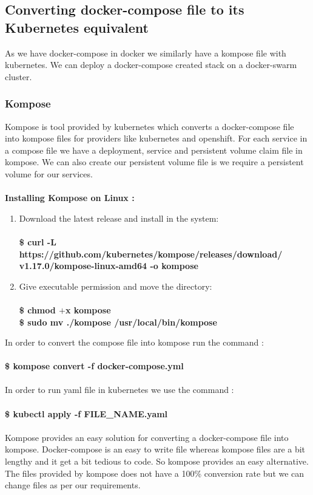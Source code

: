 \documentclass[12pt]{article}
\begin{document}
\subsection{Converting docker-compose file to its Kubernetes equivalent}
As we have docker-compose in docker we similarly have a kompose file with kubernetes. We can deploy a docker-compose created stack on a docker-swarm cluster. 
\subsubsection{Kompose}
Kompose is tool provided by kubernetes which converts a docker-compose file into kompose files for providers like kubernetes and openshift. For each service in a compose file we have a deployment, service and persistent volume claim file in kompose. We can also create our persistent volume file is we require a persistent volume for our services.\\\\
\textbf{Installing Kompose on Linux :}
\begin{enumerate}
	\item Download the latest release and install in the system:\\\\
	\textbf{\$ curl -L https://github.com/kubernetes/kompose/releases/download/\\v1.17.0/kompose-linux-amd64 -o kompose}
	\item Give executable permission and move the directory:\\\\
	\textbf{\$ chmod $+$x kompose\\
		\$ sudo mv ./kompose /usr/local/bin/kompose}
\end{enumerate}
In order to convert the compose file into kompose run the command :\\\\
\textbf{\$ kompose convert -f docker-compose.yml}\\\\
In order to run yaml file in kubernetes we use the command :\\\\
\textbf{\$ kubectl apply -f FILE\_NAME.yaml}\\\\
Kompose provides an easy solution for  converting a docker-compose file into kompose. Docker-compose is an easy to write file whereas kompose files are a bit lengthy and it get a bit tedious to code. So kompose provides an easy alternative. The files provided by kompose does not have a 100\% conversion rate but we can change files as per our requirements.\\\\
\end{document}
